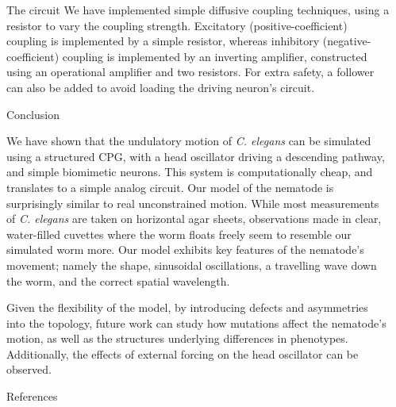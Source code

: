\documentclass[final]{beamer}
\newlength{\sepwidth}
\newlength{\colwidth}
\newcommand{\separatorcolumn}{\begin{column}{\sepwidth}\end{column}}
\begin{document}
\begin{frame}[t]
\begin{columns}[t]
\begin{column}{\colwidth}
\begin{block}{The circuit}
    We have implemented simple diffusive coupling techniques, using a resistor to vary the coupling strength.  Excitatory (positive-coefficient) coupling is implemented by a simple resistor, whereas inhibitory (negative-coefficient) coupling is implemented by an inverting amplifier, constructed using an operational amplifier and two resistors.  For extra safety, a follower can also be added to avoid loading the driving neuron's circuit.

    \end{block}

    \begin{block}{Conclusion}

    We have shown that the undulatory motion of \emph{C. elegans} can be simulated using a structured CPG, with a head oscillator driving a descending pathway, and simple biomimetic neurons.  This system is computationally cheap, and translates to a simple analog circuit.  Our model of the nematode is surprisingly similar to real unconstrained motion.  While most measurements of \emph{C. elegans} are taken on horizontal agar sheets, observations made in clear, water-filled cuvettes where the worm floats freely seem to resemble our simulated worm more.  Our model exhibits key features of the nematode's movement; namely the shape, sinusoidal oscillations, a travelling wave down the worm, and the correct spatial wavelength.

    Given the flexibility of the model, by introducing defects and asymmetries into the topology, future work can study how mutations affect the nematode's motion, as well as the structures underlying differences in phenotypes.  Additionally, the effects of external forcing on the head oscillator can be observed.

    \end{block}

    \begin{block}{References}

    \vspace{-.8em}

    \nocite{*}
    \AtNextBibliography{\tiny}
    {\printbibliography[heading = none]}

    \end{block}

\end{column}

\separatorcolumn
\end{columns}
\end{frame}
\end{document}
